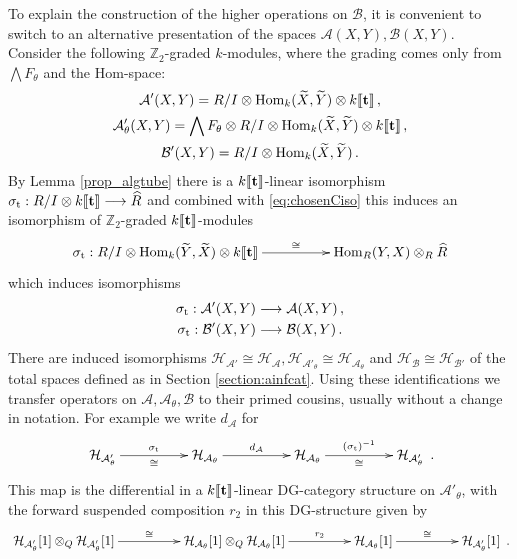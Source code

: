 \documentclass[english,letter paper,12pt,leqno]{article}
\theoremstyle{example}
\numberwithin{equation}{section}
\def\AA{\mathcal{A}}
\def\BB{\mathcal{B}}
\def\HH{\HH}
\def\HH{\mathcal{H}}
\def\Hom{\operatorname{Hom}}
\def\be{\begin{equation}}
\def\ee{\end{equation}}
\def\nZ{\mathds{Z}}
\DeclareMathOperator{\sigmastar}{\sigma_t}
\begin{document}
To explain the construction of the higher operations on $\BB$, it is convenient to switch to an alternative presentation of the spaces $\AA(X,Y), \BB(X,Y)$. Consider the following $\nZ_2$-graded $k$-modules, where the grading comes only from $\bigwedge F_\theta$ and the Hom-space:
\begin{gather*}
\AA'(X,Y) = R/I \otimes \Hom_k(\widetilde{X},\widetilde{Y}) \otimes k\llbracket \bold{t} \rrbracket\,,\\
\AA'_\theta(X,Y) = \bigwedge F_\theta \otimes R/I \otimes \Hom_k(\widetilde{X},\widetilde{Y}) \otimes k\llbracket \bold{t} \rrbracket\,, \\
\BB'(X,Y) = R/I \otimes \Hom_k(\widetilde{X},\widetilde{Y})\,.
\end{gather*}
By Lemma \ref{prop_algtube} there is a $k\llbracket \bold{t} \rrbracket$-linear isomorphism $\sigmastar: R/I \otimes k \llbracket \bold{t} \rrbracket \lto \widehat{R}$ and combined with \eqref{eq:chosenCiso} this induces an isomorphism of $\nZ_2$-graded $k\llbracket \bold{t} \rrbracket$-modules
\be\label{eq:transfer_iso_intro}
\xymatrix@C+2pc{
\sigmastar: R/I \otimes \Hom_k(\coeff{Y},\coeff{X}) \otimes k\llbracket \bold{t} \rrbracket \ar[r]^-{\cong} & 
\Hom_R(Y,X) \otimes_R \widehat{R}
}
\ee
which induces isomorphisms
\begin{gather*}
\sigmastar: \AA'(X,Y) \lto \AA(X,Y)\,,\\
\sigmastar: \BB'(X,Y) \lto \BB(X,Y)\,.
\end{gather*}
There are induced isomorphisms $\HH_{\AA'} \cong \HH_{\AA}, \HH_{\AA'_\theta} \cong \HH_{\AA_\theta}$ and $\HH_{\BB} \cong \HH_{\BB'}$ of the total spaces defined as in Section \ref{section:ainfcat}. Using these identifications we transfer operators on $\AA,\AA_\theta,\BB$ to their primed cousins, usually without a change in notation. For example we write $d_\AA$ for
\[
\xymatrix@C+2pc{
\HH_{\AA'_\theta} \ar[r]^-{\sigmastar}_-{\cong} & \HH_{\AA_\theta} \ar[r]^-{d_{\AA}} & \HH_{\AA_\theta} \ar[r]^-{(\sigmastar)^{-1}}_-{\cong} & \HH_{\AA'_\theta}
}\,.
\]
This map is the differential in a $k\llbracket \bold{t} \rrbracket$-linear DG-category structure on $\AA'_\theta$, with the forward suspended composition $r_2$ in this DG-structure given by
\[
\xymatrix@C+2pc{
\HH_{\AA'_\theta}[1] \otimes_Q \HH_{\AA'_\theta}[1] \ar[r]^-{\cong} & \HH_{\AA_\theta}[1] \otimes_Q \HH_{\AA_\theta}[1] \ar[r]^-{r_2} & \HH_{\AA_\theta}[1] \ar[r]^-{\cong} & \HH_{\AA'_{\theta}}[1]
}\,.
\]
\end{document}
